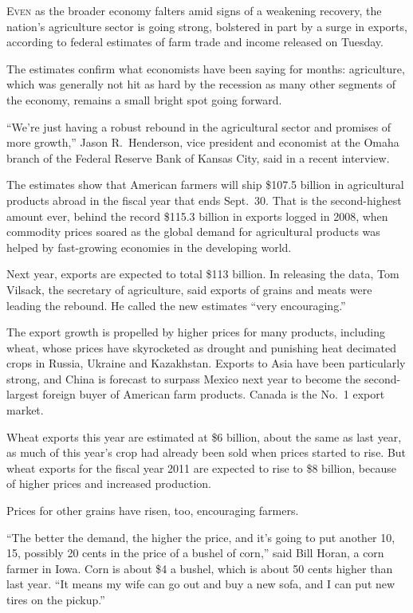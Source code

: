 ﻿\documentclass[12pt]{article}
\begin{document}
\lettrine{E}{ven} as the broader economy falters amid signs of a weakening
recovery, the nation's agriculture sector is going strong, bolstered in part by a surge in exports,
according to federal estimates of farm trade and income released on Tuesday.

The estimates confirm what economists have been saying for months: agriculture, which was generally
not hit as hard by the recession as many other segments of the economy, remains a small bright spot
going forward.

``We're just having a robust rebound in the agricultural sector and promises of more growth,'' Jason
R.~Henderson, vice president and economist at the Omaha branch of the Federal Reserve Bank of Kansas
City, said in a recent interview.

The estimates show that American farmers will ship \$107.5 billion in agricultural products abroad
in the fiscal year that ends Sept.~30. That is the second-highest amount ever, behind the record
\$115.3 billion in exports logged in 2008, when commodity prices soared as the global demand for
agricultural products was helped by fast-growing economies in the developing world.

Next year, exports are expected to total \$113 billion. In releasing the data, Tom Vilsack, the
secretary of agriculture, said exports of grains and meats were leading the rebound. He called the
new estimates ``very encouraging.''

The export growth is propelled by higher prices for many products, including wheat, whose prices
have skyrocketed as drought and punishing heat decimated crops in Russia, Ukraine and Kazakhstan.
Exports to Asia have been particularly strong, and China is forecast to surpass Mexico next year to
become the second-largest foreign buyer of American farm products. Canada is the No.~1 export
market.

Wheat exports this year are estimated at \$6 billion, about the same as last year, as much of this
year's crop had already been sold when prices started to rise. But wheat exports for the fiscal year
2011 are expected to rise to \$8 billion, because of higher prices and increased production.

Prices for other grains have risen, too, encouraging farmers.

``The better the demand, the higher the price, and it's going to put another 10, 15, possibly 20
cents in the price of a bushel of corn,'' said Bill Horan, a corn farmer in Iowa. Corn is about \$4
a bushel, which is about 50 cents higher than last year. ``It means my wife can go out and buy a new
sofa, and I can put new tires on the pickup.''
\end{document}
